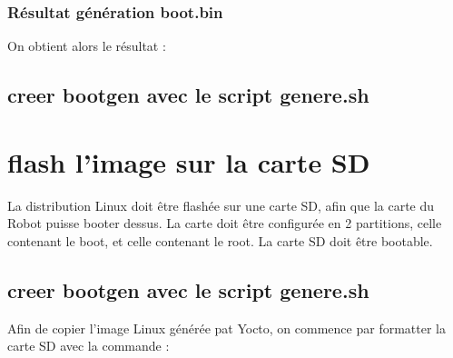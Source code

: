 \subsubsection{Résultat génération boot.bin}

On obtient alors le résultat : 
\\



\subsection{creer bootgen avec le script genere.sh}




\section{flash l’image sur la carte SD}

La distribution Linux doit être flashée sur une carte SD, afin que la carte du Robot puisse booter dessus.
La carte doit être configurée en 2 partitions, celle contenant le boot, et celle contenant le root.
La carte SD doit être bootable.

\subsection{creer bootgen avec le script genere.sh}
Afin de copier l'image Linux générée pat Yocto, on commence par formatter la carte SD avec la commande : 


